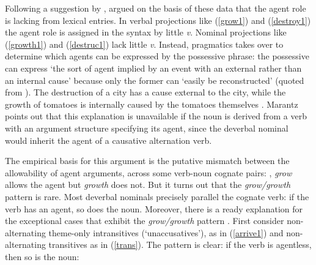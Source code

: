 \noindent
Following a suggestion by \citet{Chomsky70a}, \citet{Marantz97a} argued on the basis of these data
that the agent role is lacking from lexical entries. In verbal projections like (\ref{grow1}) and
(\ref{destroy1}) the agent role is assigned in the syntax by little \emph{v}.  Nominal projections
like (\ref{growth1}) and (\ref{destruc1}) lack little  \emph{v}.  Instead, pragmatics takes over to
determine which agents can be expressed by the possessive phrase: the possessive can express `the
sort of agent implied by an event with an external rather than an internal cause' because only the
former can `easily be reconstructed' (quoted from \citet[]{Marantz97a}).
The destruction of a city has a cause external to the city, while the growth of tomatoes is
internally caused by the tomatoes themselves \citep{Smith70a-u}.  Marantz points out that this
explanation is unavailable if the noun is derived from a verb with an argument structure specifying
its agent, since the deverbal nominal would inherit the agent of a causative alternation verb.   

The empirical basis for this argument is the putative mismatch between the allowability of agent arguments, across some verb-noun cognate pairs: \eg, \emph{grow} allows the agent but \emph{growth} does not.  But it turns out that the \emph{grow/growth} pattern
is rare.   Most deverbal nominals precisely parallel the cognate verb: if the verb has an agent, so does the noun.  Moreover, there is a ready explanation for the exceptional cases that exhibit the \emph{grow/growth} pattern \citep{Wechsler2008a}.  First consider non-alternating theme-only intransitives (`unaccusatives'), as in (\ref{arrive1}) and non-alternating transitives as in (\ref{trans}).  The pattern is clear: if the verb is agentless, then so is the noun:

